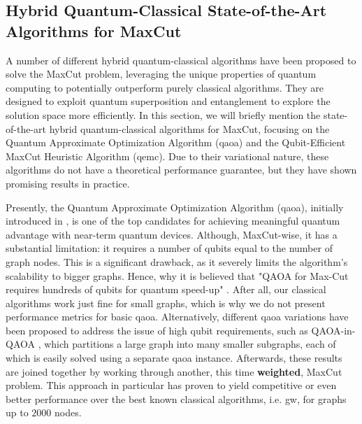 


\subsection{Hybrid Quantum-Classical State-of-the-Art Algorithms for MaxCut}
\label{section:Hybrid-Quantum-Classical-State-of-the-Art}

A number of different hybrid quantum-classical algorithms have been proposed to solve the MaxCut problem, leveraging the unique properties of quantum computing to potentially outperform purely classical algorithms. They are designed to exploit quantum superposition and entanglement to explore the solution space more efficiently. In this section, we will briefly mention the state-of-the-art hybrid quantum-classical algorithms for MaxCut, focusing on the Quantum Approximate Optimization Algorithm (\acrshort{qaoa}) and the Qubit-Efficient MaxCut Heuristic Algorithm (\acrshort{qemc}). Due to their variational nature, these algorithms do not have a theoretical performance guarantee, but they have shown promising results in practice.

Presently, the Quantum Approximate Optimization Algorithm (\acrshort{qaoa}), initially introduced in \cite{farhi2014quantum}, is one of the top candidates for achieving meaningful quantum advantage with near-term quantum devices. Although, MaxCut-wise, it has a substantial limitation: it requires a number of qubits equal to the number of graph nodes. This is a significant drawback, as it severely limits the algorithm's scalability to bigger graphs. Hence, why it is believed that "QAOA for Max-Cut requires hundreds of qubits for quantum speed-up" \cite{Guerreschi2019}. After all, our classical algorithms work just fine for small graphs, which is why we do not present performance metrics for basic \acrshort{qaoa}. Alternatively, different \acrshort{qaoa} variations have been proposed to address the issue of high qubit requirements, such as QAOA-in-QAOA \cite{zhou2022qaoainqaoa}, which partitions a large graph into many smaller subgraphs, each of which is easily solved using a separate \acrshort{qaoa} instance. Afterwards, these results are joined together by working through another, this time \textbf{weighted}, MaxCut problem. This approach in particular has proven to yield competitive or even better performance over the best known classical algorithms, i.e. \acrshort{gw}, for graphs up to $2000$ nodes.

